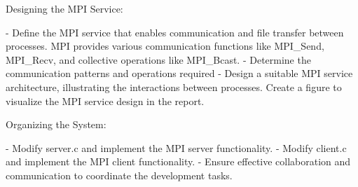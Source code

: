 Designing the MPI Service:

- Define the MPI service that enables communication and file transfer between processes. 
  MPI provides various communication functions like MPI_Send, MPI_Recv, and collective operations like MPI_Bcast.
- Determine the communication patterns and operations required
- Design a suitable MPI service architecture, illustrating the interactions between processes. 
  Create a figure to visualize the MPI service design in the report.

Organizing the System:

- Modify server.c and implement the MPI server functionality.
- Modify client.c and implement the MPI client functionality.
- Ensure effective collaboration and communication to coordinate the development tasks.